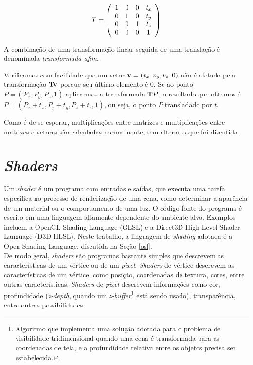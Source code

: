 \[ T = \left(
\begin{array}{cccc}
1 & 0 & 0 & {\it t_{x}} \\
0 & 1 & 0 & {\it t_{y}} \\
0 & 0 & 1 & {\it t_{z}} \\
0 & 0 & 0 & 1 
\end{array} \right)
\]

A combinação de uma transformação linear seguida de uma translação é denominada {\it transformada afim}.

Verificamos com facilidade que um vetor ${\bf v} = (v_{x},v_{y},v_{z},0)$ não é afetado pela transformação ${\bf Tv}$ porque seu último elemento é 0. Se ao ponto $P= (P_{x},P_{y},P_{z},1)$ aplicarmos a transformada ${\bf T}P$, o resultado que obtemos é $P = (P_{x} + t_{x},P_{y} + t_{y},P_{z} + t_{z},1)$, ou seja, o ponto $P$ transladado por $t$.

Como é de se esperar, multiplicações entre matrizes e multiplicações entre matrizes e vetores são calculadas normalmente, sem alterar o que foi discutido.


\section{\emph{Shaders}}
\label{shaders}

Um \emph{shader} é um programa com entradas e saídas, que executa uma tarefa específica no processo de renderização de uma cena, como determinar a aparência de um material ou o comportamento de uma luz. O código fonte do programa é escrito em uma linguagem altamente dependente do ambiente alvo. Exemplos incluem a OpenGL Shading Language (GLSL) e a Direct3D High Level Shader Language (D3D-HLSL). Neste trabalho, a linguagem de \emph{shading} adotada é a Open Shading Language, discutida na Seção \ref{osl}.\\

De modo geral, \emph{shaders} são programas bastante simples que descrevem as características de um vértice ou de um \emph{pixel}. \emph{Shaders} de vértice descrevem as características de um vértice, como posição, coordenadas de textura, cores, entre outras características. \emph{Shaders} de \emph{pixel} descrevem informações como cor, profundidade (\emph{z-depth}, quando um \emph{z-buffer}\footnote{Algoritmo que implementa uma solução adotada para o problema de visibilidade tridimensional quando uma cena é transformada para as coordenadas de tela, e a profundidade relativa entre os objetos precisa ser estabelecida.} está sendo usado), transparência, entre outras possibilidades. 


